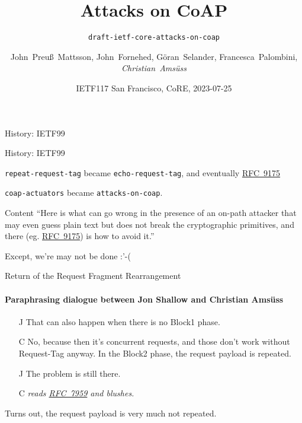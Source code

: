 \documentclass[aspectratio=169,colorlinks]{beamer}
\title{Attacks on CoAP}
\subtitle{\texttt{draft-ietf-core-attacks-on-coap}}
\author{John~Preuß~Mattsson, John~Fornehed, Göran~Selander, Francesca~Palombini, \textit{Christian~Amsüss}}
\date{IETF117 San Francisco, CoRE, 2023-07-25}
\newcommand{\rfc}[1]{\href{https://datatracker.ietf.org/doc/html/rfc#1}{RFC~#1}}
\begin{document}
\frame{\titlepage}

\begin{frame}{History: IETF99}
\end{frame}

\begin{frame}{History: IETF99}

	\texttt{repeat-request-tag} became \texttt{echo-request-tag}, and eventually \rfc{9175}

	\texttt{coap-actuators} became \texttt{attacks-on-coap}.
\end{frame}

\begin{frame}{Content}\large
	``Here is what can go wrong
	in the presence of an on-path attacker
	that may even guess plain text
	but does not break the cryptographic primitives,
	and there (eg. \rfc{9175}) is how to avoid it.''

	\vspace{2cm}

	Except, we're may not be done :'-(
\end{frame}

\begin{frame}{Return of the Request Fragment Rearrangement}\large
	\framesubtitle{Paraphrasing dialogue between Jon Shallow and Christian Amsüss}
	\begin{itemize}
		\item[J] That can also happen when there is no Block1 phase.
		\item[C] No, because then it's concurrent requests, and those don't work without Request-Tag anyway. In the Block2 phase, the request payload is repeated.
		\item[J] The problem is still there.
		\item[C] \textit{reads \rfc{7959} and blushes.}
	\end{itemize}

	\bigskip

	Turns out, the request payload is very much not repeated.
\end{frame}
\end{document}
